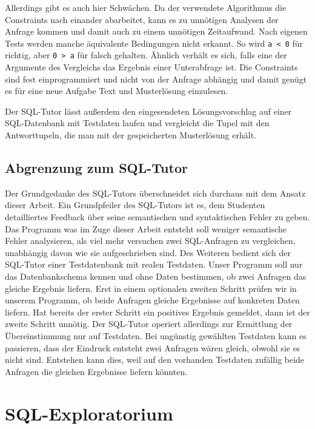 Allerdings gibt es auch hier Schwächen. Da der verwendete Algorithmus die Constraints nach einander abarbeitet, kann es zu unnötigen Analysen der Anfrage kommen und damit auch zu einem unnötigen Zeitaufwand. Nach eigenen Tests werden manche äquivalente Bedingungen nicht erkannt. So wird \verb|a < 0| für richtig, aber \verb|0 > a| für falsch gehalten. Ähnlich verhält es sich, falls eine der Argumente des Vergleichs das Ergebnis einer Unterabfrage ist. Die Constraints sind fest einprogrammiert und nicht von der Anfrage abhängig und damit genügt es für eine neue Aufgabe Text und Musterlösung einzulesen. 

Der SQL-Tutor lässt außerdem den eingesendeten Lösungsvorschlag auf einer SQL-Datenbank mit Testdaten laufen und vergleicht die Tupel mit den Antworttupeln, die man mit der gespeicherten Musterlösung erhält.

\subsection*{Abgrenzung zum SQL-Tutor}

Der Grundgedanke des SQL-Tutors überschneidet sich durchaus mit dem Ansatz dieser Arbeit. Ein Grundpfeiler des SQL-Tutors ist es, dem Studenten detailliertes Feedback über seine semantischen und syntaktischen Fehler zu geben. Das Programm was im Zuge dieser Arbeit entsteht soll weniger semantische Fehler analysieren, als viel mehr versuchen zwei SQL-Anfragen zu vergleichen, unabhängig davon wie sie aufgeschrieben sind. Des Weiteren bedient sich der SQL-Tutor einer Testdatenbank mit realen Testdaten. Unser Programm soll nur das Datenbankschema kennen und ohne Daten bestimmen, ob zwei Anfragen das gleiche Ergebnis liefern. Erst in einem optionalen zweiten Schritt prüfen wir in unserem Programm, ob beide Anfragen gleiche Ergebnisse auf konkreten Daten liefern. Hat bereits der erster Schritt ein positives Ergebnis gemeldet, dann ist der zweite Schritt unnötig. Der SQL-Tutor operiert allerdings zur Ermittlung der Übereinstimmung nur auf Testdaten. Bei ungünstig gewählten Testdaten kann es passieren, dass der Eindruck entsteht zwei Anfragen wären gleich, obwohl sie es nicht sind. Entstehen kann dies, weil auf den vorhanden Testdaten zufällig beide Anfragen die gleichen Ergebnisse liefern könnten.

\section{SQL-Exploratorium}

